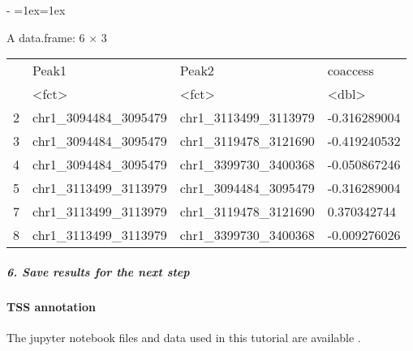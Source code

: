 \documentclass[letterpaper,10pt,english]{sphinxmanual}
\makeatletter
\newenvironment{nbsphinxfancyoutput}{%
    \let\sphinxincludegraphics\nbsphinxincludegraphics
    \nbsphinx@image@maxheight\textheight
    \advance\nbsphinx@image@maxheight -2\fboxsep   %
    \advance\nbsphinx@image@maxheight -2\fboxrule  %
    \advance\nbsphinx@image@maxheight -\baselineskip
\def\nbsphinxfcolorbox{\spx@fcolorbox{nbsphinx-code-border}{white}}%
\def\FrameCommand{\nbsphinxfcolorbox\nbsphinxfancyaddprompt\@empty}%
\def\FirstFrameCommand{\nbsphinxfcolorbox\nbsphinxfancyaddprompt\sphinxVerbatim@Continues}%
\def\MidFrameCommand{\nbsphinxfcolorbox\sphinxVerbatim@Continued\sphinxVerbatim@Continues}%
\def\LastFrameCommand{\nbsphinxfcolorbox\sphinxVerbatim@Continued\@empty}%
\MakeFramed{\advance\hsize-\width\@totalleftmargin\z@\linewidth\hsize\@setminipage}%
\lineskip=1ex\lineskiplimit=1ex\raggedright%
}{\par\unskip\@minipagefalse\endMakeFramed}
\def\nbsphinxfancyaddprompt{\ifvoid\nbsphinxpromptbox\else
    \kern\fboxrule\kern\fboxsep
    \copy\nbsphinxpromptbox
    \kern-\ht\nbsphinxpromptbox\kern-\dp\nbsphinxpromptbox
    \kern-\fboxsep\kern-\fboxrule\nointerlineskip
    \fi}
\newcommand*{\nbsphinxincludegraphics}[2][]{%
    \gdef\spx@includegraphics@options{#1}%
    \setbox\spx@image@box\hbox{\texttt{[image: \#2]}}%
    \in@false
    \ifdim \wd\spx@image@box>\linewidth
      \g@addto@macro\spx@includegraphics@options{,width=\linewidth}%
      \in@true
    \fi
    \ifdim \ht\spx@image@box>\nbsphinx@image@maxheight
      \g@addto@macro\spx@includegraphics@options{,height=\nbsphinx@image@maxheight}%
      \in@true
    \fi
    \ifin@
      \g@addto@macro\spx@includegraphics@options{,keepaspectratio}%
    \fi
    \setbox\spx@image@box\box\voidb@x %
    \expandafter\includegraphics\expandafter[\spx@includegraphics@options]{#2}%
}%
\makeatother
\begin{document}
\begin{nbsphinxfancyoutput}
A data.frame: 6 × 3
\begin{tabular}{r|lll}
  & Peak1 & Peak2 & coaccess\\
  & <fct> & <fct> & <dbl>\\
\hline
    2 & chr1\_3094484\_3095479 & chr1\_3113499\_3113979 & -0.316289004\\
    3 & chr1\_3094484\_3095479 & chr1\_3119478\_3121690 & -0.419240532\\
    4 & chr1\_3094484\_3095479 & chr1\_3399730\_3400368 & -0.050867246\\
    5 & chr1\_3113499\_3113979 & chr1\_3094484\_3095479 & -0.316289004\\
    7 & chr1\_3113499\_3113979 & chr1\_3119478\_3121690 &  0.370342744\\
    8 & chr1\_3113499\_3113979 & chr1\_3399730\_3400368 & -0.009276026\\
\end{tabular}
\end{nbsphinxfancyoutput}


\subparagraph{6. Save results for the next step}
\label{\detokenize{notebooks/01_ATAC-seq_data_processing/option1_scATAC-seq_data_analysis_with_cicero/01_atacdata_analysis_with_cicero_and_monocle3:6.-Save-results-for-the-next-step}}
{
\begin{sphinxVerbatim}[commandchars=\\\{\}]
\llap{\color{nbsphinxin}[ ]:\,\hspace{\fboxrule}\hspace{\fboxsep}}  
      
      

\end{sphinxVerbatim}
}


\paragraph{TSS annotation}
\label{\detokenize{tutorials/atac:tss-annotation}}
The jupyter notebook files and data used in this tutorial are available  .
\end{document}
